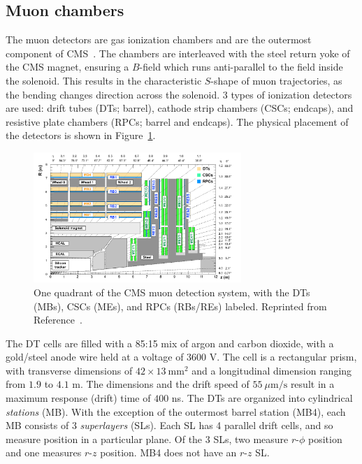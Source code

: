 \subsection{Muon chambers}

The muon detectors are gas ionization chambers and are the outermost component of CMS~\cite{cmsmuon}. 
The chambers are interleaved with the steel return yoke of the CMS magnet, ensuring a $B$-field which runs anti-parallel to the field inside the solenoid.
This results in the characteristic $S$-shape of muon trajectories, as the bending changes direction across the solenoid. 
3 types of ionization detectors are used: drift tubes (DTs; barrel), cathode strip chambers (CSCs; endcaps), and resistive plate chambers (RPCs; barrel and endcaps).
The physical placement of the detectors is shown in Figure~\ref{fig:cms:muondet}.

\begin{figure}[]
    \begin{center}
        \includegraphics[width=0.7\textwidth]{figures/cms/muon.png}
        \caption{One quadrant of the CMS muon detection system, with the DTs (MBs), CSCs (MEs), and RPCs (RBs/REs) labeled. 
                 Reprinted from Reference~\cite{cmsmuon}.}
        \label{fig:cms:muondet}
    \end{center}
\end{figure}

The DT cells are filled with a 85:15 mix of argon and carbon dioxide, with a gold/steel anode wire held at a voltage of $3600$ V.
The cell is a rectangular prism, with transverse dimensions of $42\times13~\mathrm{mm}^2$ and a longitudinal dimension ranging from $1.9$ to $4.1$ m.
The dimensions and the drift speed of $55~\mu\mathrm{m/s}$ result in a maximum response (drift) time of $400$ ns.
The DTs are organized into cylindrical \emph{stations} (MB).
With the exception of the outermost barrel station (MB4), each MB consists of 3 \emph{superlayers} (SLs).
Each SL has 4 parallel drift cells, and so measure position in a particular plane.
Of the 3 SLs, two measure $r$-$\phi$ position and one measures $r$-$z$ position. 
MB4 does not have an $r$-$z$ SL.


